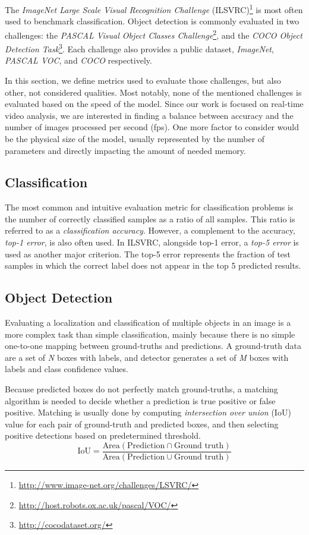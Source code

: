 The \textit{ImageNet Large Scale Visual Recognition Challenge }(ILSVRC)\footnote{\url{http://www.image-net.org/challenges/LSVRC/}} is most often used to benchmark classification. Object detection is commonly evaluated in two challenges: the \textit{PASCAL Visual Object Classes Challenge}\footnote{\url{http://host.robots.ox.ac.uk/pascal/VOC/}}, and the \textit{COCO Object Detection Task}\footnote{\url{http://cocodataset.org/}}. Each challenge also provides a public dataset, \textit{ImageNet}, \textit{PASCAL VOC}, and \textit{COCO} respectively.

In this section, we define metrics used to evaluate those challenges, but also other, not considered qualities. Most notably, none of the mentioned challenges is evaluated based on the speed of the model. Since our work is focused on real-time video analysis, we are interested in finding a balance between accuracy and the number of images processed per second (fps). One more factor to consider would be the physical size of the model, usually represented by the number of parameters and directly impacting the amount of needed memory.

\subsection{Classification}
The most common and intuitive evaluation metric for classification problems is the number of correctly classified samples as a ratio of all samples. This ratio is referred to as a \textit{classification accuracy}. However, a complement to the accuracy, \textit{top-1 error}, is also often used. In ILSVRC,  alongside top-1 error, a \textit{top-5 error} is used as another major criterion. The top-5 error represents the fraction of test samples in which the correct label does not appear in the top 5 predicted results.

\subsection{Object Detection}
Evaluating a localization and classification of multiple objects in an image is a more complex task than simple classification, mainly because there is no simple one-to-one mapping between ground-truths and predictions. A ground-truth data are a set of \textit{N} boxes with labels, and detector generates a set of \textit{M} boxes with labels and class confidence values.

Because predicted boxes do not perfectly match ground-truths, a matching algorithm is needed to decide whether a prediction is true positive or false positive. Matching is usually done by computing \textit{intersection over union} (IoU) value for each pair of ground-truth and predicted boxes, and then selecting positive detections based on predetermined threshold.
$$\text{IoU} = \frac{\text{Area}(\text{Prediction} \cap \text{Ground truth})}{\text{Area}(\text{Prediction} \cup \text{Ground truth})}$$

